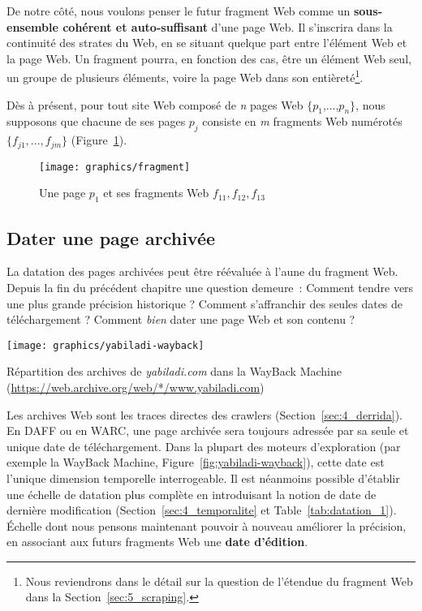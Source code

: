 \documentclass[symmetric,justified,marginals=raggedouter]{tufte-book}
\begin{document}
\noindent De notre côté, nous voulons penser le futur fragment Web comme un \textbf{sous-ensemble cohérent et auto-suffisant} d'une page Web. Il s'inscrira dans la continuité des strates du Web, en se situant quelque part entre l'élément Web et la page Web. Un fragment pourra, en fonction des cas, être un élément Web seul, un groupe de plusieurs éléments, voire la page Web dans son entièreté\footnote{\RaggedOuter Nous reviendrons dans le détail sur la question de l'étendue du fragment Web dans la Section~\ref{sec:5_scraping}.}. 

Dès à présent, pour tout site Web composé de \textit{n} pages Web $\{p_1$,...,$p_n\}$, nous supposons que chacune de ses pages $p_j$ consiste en \textit{m} fragments Web numérotés $\{f_{j1},...,f_{jm}\}$ (Figure~\ref{fig:fragment}).

\begin{figure}%
  \texttt{[image: graphics/fragment]}
  \caption{Une page $p_1$ et ses fragments Web $f_{11}, f_{12}, f_{13}$}
  \label{fig:fragment}
\end{figure}

\subsection{Dater une page archivée}

\noindent La datation des pages archivées peut être réévaluée à l'aune du fragment Web. Depuis la fin du précédent chapitre une question demeure~: Comment tendre vers une plus grande précision historique ? Comment s'affranchir des seules dates de téléchargement ? Comment \textit{bien} dater une page Web et son contenu ?

\begin{marginfigure}%
  \texttt{[image: graphics/yabiladi-wayback]}
  \caption{Répartition des archives de \textit{yabiladi.com} dans la WayBack Machine (\url{https://web.archive.org/web/*/www.yabiladi.com})}
  \label{fig:yabiladi-wayback}
\end{marginfigure}

Les archives Web sont les traces directes des crawlers (Section~\ref{sec:4_derrida}). En DAFF ou en WARC, une page archivée sera toujours adressée par sa seule et unique date de téléchargement. Dans la plupart des moteurs d'exploration (par exemple la WayBack Machine, Figure~\ref{fig:yabiladi-wayback}), cette date est l'unique dimension temporelle interrogeable. Il est néanmoins possible d'établir une échelle de datation plus complète en introduisant la notion de date de dernière modification (Section~\ref{sec:4_temporalite} et Table~\ref{tab:datation_1}). Échelle dont nous pensons maintenant pouvoir à nouveau améliorer la précision, en associant aux futurs fragments Web une \textbf{date d'édition}. 
\end{document}
